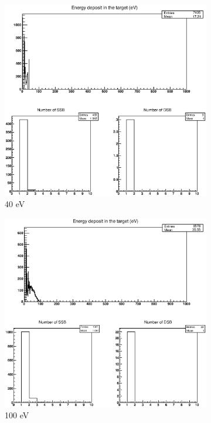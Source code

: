 \begin{figure}
\centering
\begin{subfigure}{.5\textwidth}
  \centering
  \includegraphics[width=.78\linewidth]{./Figures/040.eps}
  \caption{40 eV}
  \label{fig:sube1}
\end{subfigure}%
\begin{subfigure}{.5\textwidth}
  \centering
  \includegraphics[width=.78\linewidth]{./Figures/1.eps}
  \caption{100 eV}
  \label{fig:sube2}
\end{subfigure}
\begin{subfigure}{.5\textwidth}
  \centering

\end{subfigure}
\end{figure}
